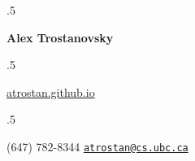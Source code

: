 \documentclass[margin]{res}
\begin{document}
\moveleft.5\hoffset\centerline{\large\bf Alex Trostanovsky}
\moveleft.5\hoffset\centerline{
      {\href{atrostan.github.io}{\textsf{atrostan.github.io}}}      
      \textbullet{}
      \textbullet{}}

\moveleft.5\hoffset\centerline{(647) 782-8344 \textbullet 
{ \tt \href{mailto:atrostan@cs.ubc.ca}{atrostan@cs.ubc.ca}}}
\end{document}
